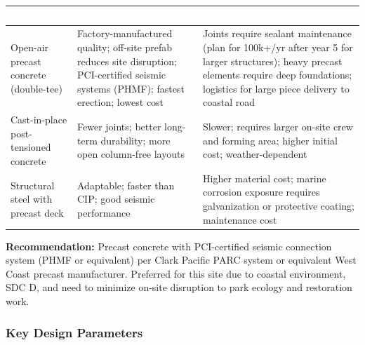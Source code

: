 \documentclass[11pt,letterpaper]{article}
\newcommand{\tableheader}[1]{\textbf{\sffamily\textcolor{white}{#1}}}
\begin{document}
\begin{center}
\begin{tabularx}{\textwidth}{L{3cm}L{3.5cm}X}
\toprule
{}
\tableheader{System} & \tableheader{Pros for This Site} & \tableheader{Cons / Considerations} \\
\midrule
Open-air precast concrete (double-tee) & Factory-manufactured quality; off-site prefab reduces site disruption; PCI-certified seismic systems (PHMF); fastest erection; lowest cost & Joints require sealant maintenance (plan for 100k+/yr after year 5 for larger structures); heavy precast elements require deep foundations; logistics for large piece delivery to coastal road \\
Cast-in-place post-tensioned concrete & Fewer joints; better long-term durability; more open column-free layouts & Slower; requires larger on-site crew and forming area; higher initial cost; weather-dependent \\
Structural steel with precast deck & Adaptable; faster than CIP; good seismic performance & Higher material cost; marine corrosion exposure requires galvanization or protective coating; maintenance cost \\
\bottomrule
\end{tabularx}
\end{center}

\textbf{Recommendation:} Precast concrete with PCI-certified seismic connection system (PHMF or equivalent) per Clark Pacific PARC system or equivalent West Coast precast manufacturer. Preferred for this site due to coastal environment, SDC D, and need to minimize on-site disruption to park ecology and restoration work.

\subsubsection{Key Design Parameters}
\end{document}
